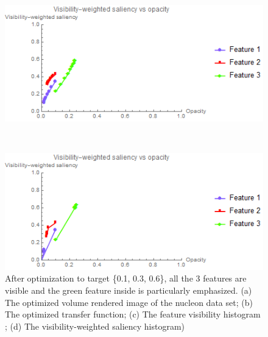 \begin{figure}
	\begin{minipage}{.49\textwidth}
		\includegraphics[width=1\linewidth]{images/nucleon_naive_saliencyopacity_fixed}
		\subcaption{}
	\end{minipage}~
	\begin{minipage}{.49\textwidth}
		\includegraphics[width=1\linewidth]{images/nucleon_naive_saliencyopacity_parallelsearch}
		\subcaption{}
	\end{minipage}
	\caption{After optimization to target \{0.1, 0.3, 0.6\}, all the 3 features are visible and the green feature inside is particularly emphasized. (a) The optimized volume rendered image of the nucleon data set; (b) The optimized transfer function; (c) The feature visibility histogram \cite{wang_efficient_2011}; (d) The visibility-weighted saliency histogram)}
	\label{fig:nucleon_naive_optimized}
\end{figure}

